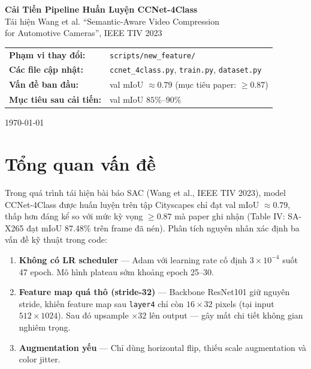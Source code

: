 \documentclass[12pt,a4paper]{article}
\begin{document}
\begin{titlepage}
  \centering
  \vspace*{2cm}
  {\LARGE \textbf{Cải Tiến Pipeline Huấn Luyện CCNet-4Class}}\\[0.5cm]
  {\large Tái hiện Wang et al. ``Semantic-Aware Video Compression\\
  for Automotive Cameras'', IEEE TIV 2023}\\[1.5cm]

  \begin{tabular}{ll}
    \textbf{Phạm vi thay đổi:} & \texttt{scripts/new\_feature/} \\
    \textbf{Các file cập nhật:} & \texttt{ccnet\_4class.py}, \texttt{train.py}, \texttt{dataset.py} \\
    \textbf{Vấn đề ban đầu:} & val mIoU $\approx 0.79$ (mục tiêu paper: $\geq 0.87$) \\
    \textbf{Mục tiêu sau cải tiến:} & val mIoU $85\%$–$90\%$ \\
  \end{tabular}

  \vfill
  \today
\end{titlepage}

\tableofcontents
\newpage

\section{Tổng quan vấn đề}

Trong quá trình tái hiện bài báo SAC (Wang et al., IEEE TIV 2023), model CCNet-4Class
được huấn luyện trên tập Cityscapes chỉ đạt val mIoU $\approx 0.79$, thấp hơn đáng kể
so với mức kỳ vọng $\geq 0.87$ mà paper ghi nhận (Table IV: SA-X265 đạt mIoU 87.48\%
trên frame đã nén). Phân tích nguyên nhân xác định ba vấn đề kỹ thuật trong code:

\begin{enumerate}[leftmargin=*, label=\arabic*.]
  \item \textbf{Không có LR scheduler} — Adam với learning rate cố định $3\times10^{-4}$
        suốt 47 epoch. Mô hình plateau sớm khoảng epoch 25–30.
  \item \textbf{Feature map quá thô (stride-32)} — Backbone ResNet101 giữ nguyên stride,
        khiến feature map sau \texttt{layer4} chỉ còn $16\times32$ pixels (tại input
        $512\times1024$). Sau đó upsample $\times32$ lên output — gây mất chi tiết không gian
        nghiêm trọng.
  \item \textbf{Augmentation yếu} — Chỉ dùng horizontal flip, thiếu scale augmentation
        và color jitter.
\end{enumerate}
\end{document}
